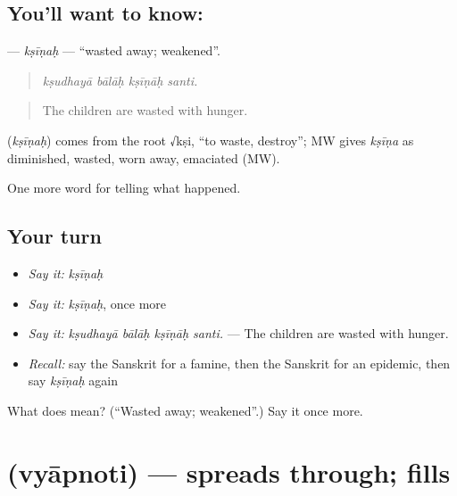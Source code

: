 \subsection*{You'll want to know: }
\textbf{} — \emph{kṣīṇaḥ} — \textquotedblleft{}wasted away; weakened\textquotedblright{}.

\begin{quote}
   
\end{quote}

\begin{quote}
\emph{kṣudhayā bālāḥ kṣīṇāḥ santi.}
\end{quote}

\begin{quote}
The children are wasted with hunger.
\end{quote}

\begin{cousinweb}
\textbf{} (\emph{kṣīṇaḥ}) comes from the root √kṣi, \textquotedblleft{}to waste, destroy\textquotedblright{}; MW gives \emph{kṣīṇa} as diminished, wasted, worn away, emaciated (MW).
\end{cousinweb}

\begin{grammarlens}[title={What you've built}]
One more word for telling what happened.
\end{grammarlens}

\subsection*{Your turn}
\begin{itemize}
\raggedright
  \item \emph{Say it:} \emph{kṣīṇaḥ}
  \item \emph{Say it:} \emph{kṣīṇaḥ}, once more
  \item \emph{Say it:} \emph{kṣudhayā bālāḥ kṣīṇāḥ santi.} — The children are wasted with hunger.
  \item \emph{Recall:} say the Sanskrit for a famine, then the Sanskrit for an epidemic, then say \emph{kṣīṇaḥ} again
\end{itemize}

\begin{tcolorbox}[breakable,colback=teal!4,colframe=teal!35!black,title={Before you move on}]
What does  mean? (\textquotedblleft{}Wasted away; weakened\textquotedblright{}.) Say it once more.
\end{tcolorbox}
\section[\texorpdfstring{\sk{व्याप्नोति} (vyāpnoti)}{व्याप्नोति (vyāpnoti)}]{ (vyāpnoti) — spreads through; fills}

